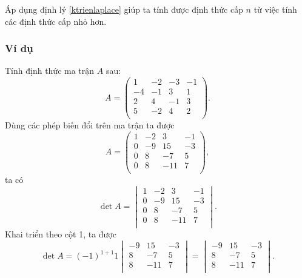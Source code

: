 \documentclass[12pt,a4paper]{report}
\begin{document}
Áp dụng định lý \eqref{ktrienlaplace} giúp ta tính được định thức cấp $n$ từ việc tính các định thức cấp nhỏ hơn.

\subsubsection*{Ví dụ}
Tính định thức ma trận $A$ sau:
\begin{equation*}
A =
\begin{pmatrix}
    1 & -2 & -3 & -1 \\
    -4 & -1 & 3 & 1 \\
    2 & 4 & -1 & 3 \\
    5 & -2 & 4 & 2 \\
\end{pmatrix}.
\end{equation*}
Dùng các phép biến đổi trên ma trận ta được
\begin{equation*}
A =
\begin{pmatrix}
    1 & -2 & 3 & -1 \\
    0 & -9 & 15 & -3 \\
    0 & 8 & -7 & 5 \\
    0 & 8 & -11 & 7 \\
\end{pmatrix},
\end{equation*}
ta có
\begin{equation*}
\det A =
\begin{vmatrix}
    1 & -2 & 3 & -1 \\
    0 & -9 & 15 & -3 \\
    0 & 8 & -7 & 5 \\
    0 & 8 & -11 & 7 \\
\end{vmatrix}.
\end{equation*}
Khai triển theo cột 1, ta được
\begin{equation*}
    \det A = (-1)^{1+1}1
    \begin{vmatrix}
    -9 & 15 & -3 \\
    8 & -7 & 5 \\
    8 & -11 & 7 \\
    \end{vmatrix}
    =
    \begin{vmatrix}
    -9 & 15 & -3 \\
    8 & -7 & 5 \\
    8 & -11 & 7 \\
    \end{vmatrix}.
\end{equation*}
\end{document}
